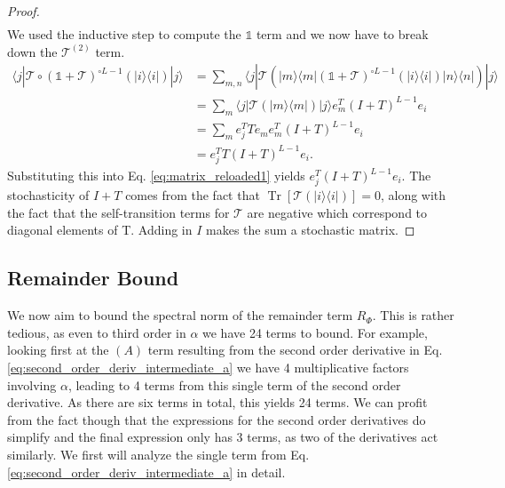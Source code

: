 \documentclass{article}
\newcommand{\ket}[1]{|#1\rangle}
\newcommand{\bra}[1]{\langle #1|}
\newcommand{\ketbra}[2]{| #1\rangle\! \langle #2|}
\newcommand{\brackets}[1]{\left[ #1 \right]}
\DeclareMathOperator{\Tr}{Tr}
\newcommand{\trace}[1]{\Tr \brackets{ #1 }}
\newcommand{\identity}{\mathds{1}}
\begin{document}
\begin{proof}
\begin{align}
\end{align}
We used the inductive step to compute the $\identity$ term and we now have to break down the $\mathcal{T}^{(2)}$ term. 
\begin{align}
    \bra{j} \mathcal{T} \circ (\identity + \mathcal{T})^{\circ L - 1} (\ketbra{i}{i}) \ket{j} &= \sum_{m, n} \bra{j} \mathcal{T}\left( \ketbra{m}{m} (\identity + \mathcal{T})^{\circ L - 1} (\ketbra{i}{i}) \ketbra{n}{n} \right) \ket{j} \\
    &= \sum_{m} \bra{j} \mathcal{T} \left( \ketbra{m}{m} \right) \ket{j} e_m^T (I + T)^{L - 1} e_i \\
    &= \sum_m e_j^T T e_m e_m^T (I + T)^{L -1} e_i \\
    &= e_j^T T(I + T)^{L-1} e_i.
\end{align}
Substituting this into Eq. \eqref{eq:matrix_reloaded1} yields $e_j^T (I + T)^{L-1} e_i$. The stochasticity of $I + T$ comes from the fact that $\trace{\mathcal{T}(\ketbra{i}{i})} = 0$, along with the fact that the self-transition terms for $\mathcal{T}$ are negative which correspond to diagonal elements of T. Adding in $I$ makes the sum a stochastic matrix.
\end{proof}


\subsection{Remainder Bound}
We now aim to bound the spectral norm of the remainder term $R_{\Phi}$. This is rather tedious, as even to third order in $\alpha$ we have 24 terms to bound. For example, looking first at the $(A)$ term resulting from the second order derivative in Eq. \eqref{eq:second_order_deriv_intermediate_a} we have 4 multiplicative factors involving $\alpha$, leading to 4 terms from this single term of the second order derivative. As there are six terms in total, this yields 24 terms. We can profit from the fact though that the expressions for the second order derivatives do simplify and the final expression only has 3 terms, as two of the derivatives act similarly. We first will analyze the single term from Eq. \eqref{eq:second_order_deriv_intermediate_a} in detail. 
\end{document}
